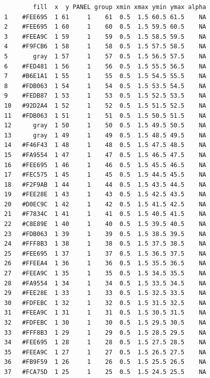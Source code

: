 \documentclass[12pt,twoside]{reedthesis}
\begin{document}
  \begin{Shaded}
  \begin{Highlighting}[]
  \NormalTok{gcolor$data[[}\NormalTok{]]}
  \end{Highlighting}
  \end{Shaded}
  
  \begin{verbatim}
          fill  x  y PANEL group xmin xmax ymin ymax alpha
  1    #FEE695  1 61     1    61  0.5  1.5 60.5 61.5    NA
  2    #FEE695  1 60     1    60  0.5  1.5 59.5 60.5    NA
  3    #FEEA9C  1 59     1    59  0.5  1.5 58.5 59.5    NA
  4    #F9FCB6  1 58     1    58  0.5  1.5 57.5 58.5    NA
  5       gray  1 57     1    57  0.5  1.5 56.5 57.5    NA
  6    #FED481  1 56     1    56  0.5  1.5 55.5 56.5    NA
  7    #B6E1A1  1 55     1    55  0.5  1.5 54.5 55.5    NA
  8    #FDB063  1 54     1    54  0.5  1.5 53.5 54.5    NA
  9    #FEDB87  1 53     1    53  0.5  1.5 52.5 53.5    NA
  10   #92D2A4  1 52     1    52  0.5  1.5 51.5 52.5    NA
  11   #FDB063  1 51     1    51  0.5  1.5 50.5 51.5    NA
  12      gray  1 50     1    50  0.5  1.5 49.5 50.5    NA
  13      gray  1 49     1    49  0.5  1.5 48.5 49.5    NA
  14   #F46F43  1 48     1    48  0.5  1.5 47.5 48.5    NA
  15   #FA9554  1 47     1    47  0.5  1.5 46.5 47.5    NA
  16   #FEE695  1 46     1    46  0.5  1.5 45.5 46.5    NA
  17   #FEC575  1 45     1    45  0.5  1.5 44.5 45.5    NA
  18   #F2F9AB  1 44     1    44  0.5  1.5 43.5 44.5    NA
  19   #FEE28E  1 43     1    43  0.5  1.5 42.5 43.5    NA
  20   #D0EC9C  1 42     1    42  0.5  1.5 41.5 42.5    NA
  21   #F7834C  1 41     1    41  0.5  1.5 40.5 41.5    NA
  22   #C8E89E  1 40     1    40  0.5  1.5 39.5 40.5    NA
  23   #FDB063  1 39     1    39  0.5  1.5 38.5 39.5    NA
  24   #FFF8B3  1 38     1    38  0.5  1.5 37.5 38.5    NA
  25   #FEE695  1 37     1    37  0.5  1.5 36.5 37.5    NA
  26   #FFEEA4  1 36     1    36  0.5  1.5 35.5 36.5    NA
  27   #FEEA9C  1 35     1    35  0.5  1.5 34.5 35.5    NA
  28   #FA9554  1 34     1    34  0.5  1.5 33.5 34.5    NA
  29   #FEE28E  1 33     1    33  0.5  1.5 32.5 33.5    NA
  30   #FDFEBC  1 32     1    32  0.5  1.5 31.5 32.5    NA
  31   #FEEA9C  1 31     1    31  0.5  1.5 30.5 31.5    NA
  32   #FDFEBC  1 30     1    30  0.5  1.5 29.5 30.5    NA
  33   #FFF8B3  1 29     1    29  0.5  1.5 28.5 29.5    NA
  34   #FEE695  1 28     1    28  0.5  1.5 27.5 28.5    NA
  35   #FEEA9C  1 27     1    27  0.5  1.5 26.5 27.5    NA
  36   #FB9F59  1 26     1    26  0.5  1.5 25.5 26.5    NA
  37   #FCA75D  1 25     1    25  0.5  1.5 24.5 25.5    NA

\end{verbatim}
\end{document}
